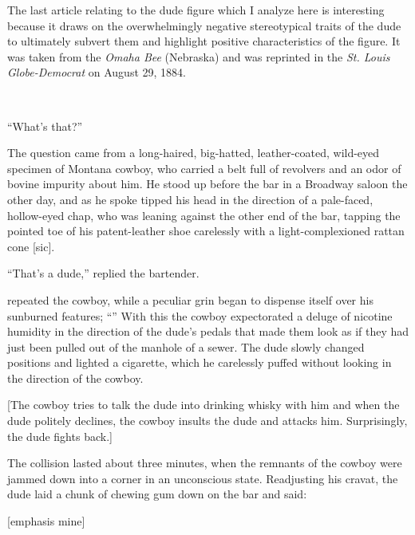 The last article relating to the dude figure which I analyze here is interesting because it draws on the overwhelmingly negative stereotypical traits of the dude to ultimately subvert them and highlight positive characteristics of the figure. It was taken from the \emph{Omaha Bee} (Nebraska) and was reprinted in the \emph{St. Louis Globe-Democrat} on August 29, 1884.

\begin{ipquote}
\begin{center}
\\
\end{center}
“What’s that?”

The question came from a long-haired, big-hatted, leather-coated, wild-eyed specimen of Montana cowboy, who carried a belt full of revolvers and an odor of bovine impurity about him. He stood up before the bar in a Broadway saloon the other day, and as he spoke tipped his head in the direction of a pale-faced, hollow-eyed chap, who was leaning against the other end of the bar, tapping the pointed to{\kern0pt}e of his patent-leather sho{\kern0pt}e carelessly with a light-complexioned rattan cone [sic].

“That’s a dude,” replied the bartender.

 repeated the cowboy, while a peculiar grin began to dispense itself over his sunburned features; “” With this the cowboy expectorated a deluge of nicotine humidity in the direction of the dude’s pedals that made them look as if they had just been pulled out of the manhole of a sewer. The dude slowly changed positions and lighted a cigarette, which he carelessly puffed without looking in the direction of the cowboy.

{[The cowboy tries to talk the dude into drinking whisky with him and when the dude politely declines, the cowboy insults the dude and attacks him. Surprisingly, the dude fights back.]}

{The collision lasted about three minutes, when the remnants of the cowboy were jammed down into a corner in an unconscious state. Readjusting his cravat, the dude laid a chunk of chewing gum down on the bar and said: 

\raggedleft
{[emphasis mine]}\\}
\end{ipquote}

